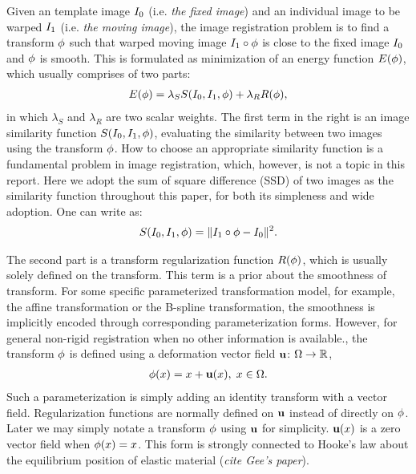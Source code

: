 \documentclass[letterpaper,12pt]{article}
\begin{document}
Given an template image $I_0$ (i.e. \textit{the fixed image}) and an individual image to be warped $I_1$ (i.e. \textit{the moving image}), the image registration problem is to find a transform $\phi$ such that warped moving image $I_1 \circ \phi$ is close to the fixed image $I_0$ and $\phi$ is smooth. 
This is formulated as minimization of an energy function $E(\phi)$, which usually comprises of two parts:
\begin{align}
\label{eq:energy}
E(\phi) = \lambda_S S(I_0,I_1,\phi) + \lambda_R R(\phi),
\end{align}
in which $\lambda_S$ and $\lambda_R$ are two scalar weights. The first term in the right is an image similarity function $S(I_0, I_1, \phi)$, evaluating the similarity between two images using the transform $\phi$. 
How to choose an appropriate similarity function is a fundamental problem in image registration, which, however, is not a topic in this report. 
Here we adopt the sum of square difference (SSD) of two images as the similarity function throughout this paper, for both its simpleness and wide adoption. One can write as:
\begin{align}
S(I_0, I_1, \phi) = \| I_1 \circ \phi - I_0 \|^2.
\label{eq:SSD}
\end{align}

The second part is a transform regularization function $R(\phi)$, which is usually solely defined on the transform. This term is a prior about the smoothness of transform. For some specific parameterized transformation model, for example, the affine transformation or the B-spline transformation, the smoothness is implicitly encoded through corresponding parameterization forms. 
However, for general non-rigid registration when no other information is available., the transform $\phi$ is defined using a deformation vector field $\mathbf{u}$: $\Omega \to \mathbb{R}$,
\begin{align}
\phi(x) = x + \mathbf{u}(x), \; x \in \Omega.
\end{align}
Such a parameterization is simply adding an identity transform with a vector field. 
Regularization functions are normally defined on $\mathbf{u}$ instead of directly on $\phi$.
Later we may simply notate a transform $\phi$ using $\mathbf{u}$ for simplicity. 
$\mathbf{u}(x)$ is a zero vector field when $\phi(x)=x$. 
This form is strongly connected to Hooke's law about the equilibrium position of elastic material (\textit{cite Gee's paper}). 
\end{document}
